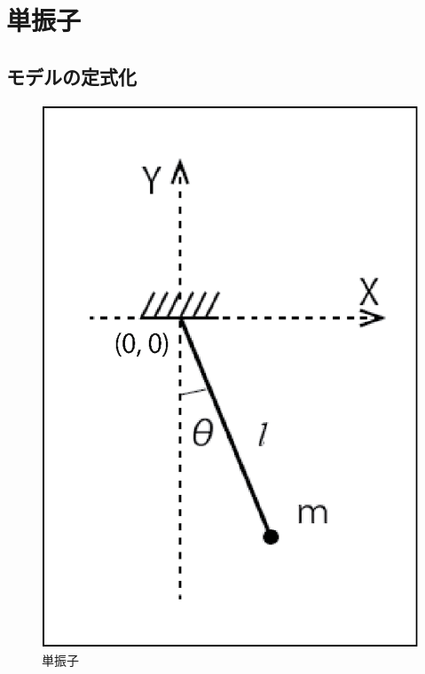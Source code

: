 \chapter{単振子}

\section{モデルの定式化}

\begin{figure}[htbp]
  \begin{minipage}[b]{0.45\linewidth}
    \centering
    \includegraphics[keepaspectratio, scale=0.6]{eps/single.eps}
    \caption{単振子}
  \end{minipage}
\end{figure}

